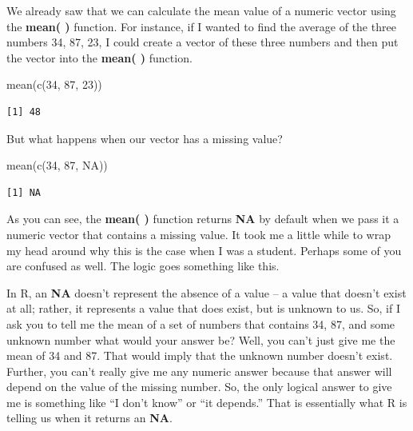 \documentclass[
  letterpaper,
  DIV=11,
  numbers=noendperiod]{scrreprt}
\newenvironment{Shaded}{\begin{snugshade}}{\end{snugshade}}
\newcommand{\ConstantTok}[1]{\textcolor[rgb]{0.56,0.35,0.01}{#1}}
\newcommand{\DecValTok}[1]{\textcolor[rgb]{0.68,0.00,0.00}{#1}}
\newcommand{\FunctionTok}[1]{\textcolor[rgb]{0.28,0.35,0.67}{#1}}
\newcommand{\NormalTok}[1]{\textcolor[rgb]{0.00,0.23,0.31}{#1}}
\begin{document}
We already saw that we can calculate the mean value of a numeric vector
using the \textbf{mean( )} function. For instance, if I wanted to find
the average of the three numbers 34, 87, 23, I could create a vector of
these three numbers and then put the vector into the \textbf{mean( )}
function.

\begin{Shaded}
\begin{Highlighting}[]
\FunctionTok{mean}\NormalTok{(}\FunctionTok{c}\NormalTok{(}\DecValTok{34}\NormalTok{, }\DecValTok{87}\NormalTok{, }\DecValTok{23}\NormalTok{))}
\end{Highlighting}
\end{Shaded}

\begin{verbatim}
[1] 48
\end{verbatim}

But what happens when our vector has a missing value?

\begin{Shaded}
\begin{Highlighting}[]
\FunctionTok{mean}\NormalTok{(}\FunctionTok{c}\NormalTok{(}\DecValTok{34}\NormalTok{, }\DecValTok{87}\NormalTok{, }\ConstantTok{NA}\NormalTok{))}
\end{Highlighting}
\end{Shaded}

\begin{verbatim}
[1] NA
\end{verbatim}

As you can see, the \textbf{mean( )} function returns \textbf{NA} by
default when we pass it a numeric vector that contains a missing value.
It took me a little while to wrap my head around why this is the case
when I was a student. Perhaps some of you are confused as well. The
logic goes something like this.

In R, an \textbf{NA} doesn't represent the absence of a value -- a value
that doesn't exist at all; rather, it represents a value that does
exist, but is unknown to us. So, if I ask you to tell me the mean of a
set of numbers that contains 34, 87, and some unknown number what would
your answer be? Well, you can't just give me the mean of 34 and 87. That
would imply that the unknown number doesn't exist. Further, you can't
really give me any numeric answer because that answer will depend on the
value of the missing number. So, the only logical answer to give me is
something like ``I don't know'' or ``it depends.'' That is essentially
what R is telling us when it returns an \textbf{NA}.
\end{document}
